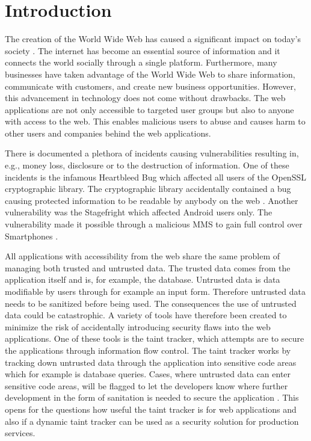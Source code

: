 \chapter{Introduction}
\label{Introduction}
The creation of the World Wide Web has caused a significant impact on today's society \parencite{www}. The internet has become an essential source of information and it connects the world socially through a single platform. Furthermore, many businesses have taken advantage of the World Wide Web to share information, communicate with customers, and create new business opportunities. However, this advancement in technology does not come without drawbacks. The web applications are not only accessible to targeted user groups but also to anyone with access to the web. This enables malicious users to abuse and causes harm to other users and companies behind the web applications.

There is documented a plethora of incidents causing vulnerabilities resulting in, e.g., money loss, disclosure or to the destruction of information. One of these incidents is the infamous Heartbleed Bug which affected all users of the OpenSSL cryptographic library. The cryptographic library accidentally contained a bug causing protected information to be readable by anybody on the web \parencite{Heartbleed}. Another vulnerability was the Stagefright which affected Android users only. The vulnerability made it possible through a malicious MMS to gain full control over Smartphones \parencite{2015ASvt}. 

All applications with accessibility from the web share the same problem of managing both trusted and untrusted data. The trusted data comes from the application itself and is, for example, the database. Untrusted data is data modifiable by users through for example an input form. Therefore untrusted data needs to be sanitized before being used. The consequences the use of untrusted data could be catastrophic. A variety of tools have therefore been created to minimize the risk of accidentally introducing security flaws into the web applications. One of these tools is the taint tracker, which attempts are to secure the applications through information flow control. The taint tracker works by tracking down untrusted data through the application into sensitive code areas which for example is database queries. Cases, where untrusted data can enter sensitive code areas, will be flagged to let the developers know where further development in the form of sanitation is needed to secure the application \parencite{Pan2015, Venkataramani2008}. This opens for the questions how useful the taint tracker is for web applications and also if a dynamic taint tracker can be used as a security solution for production services.



